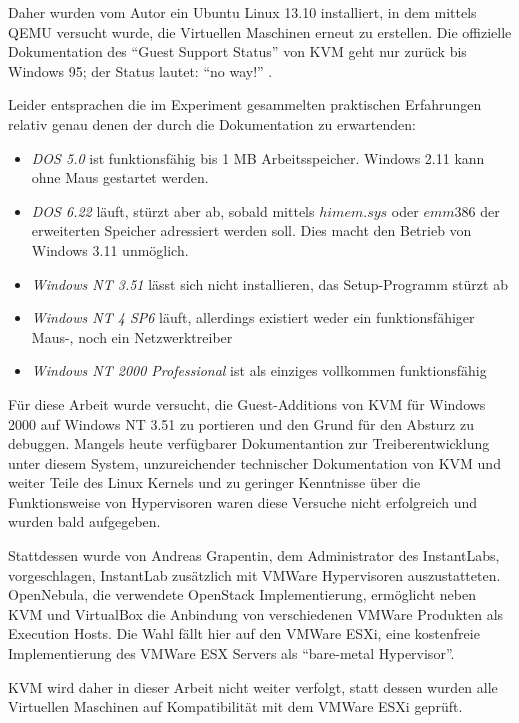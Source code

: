 	Daher wurden vom Autor ein Ubuntu Linux 13.10 installiert, in dem mittels QEMU versucht wurde, die Virtuellen Maschinen erneut zu erstellen.
	Die offizielle Dokumentation des "`Guest Support Status"' von KVM geht nur zurück bis Windows 95;
	der Status lautet: "`no way!"' \cite{KVMStatus}.

	Leider entsprachen die im Experiment gesammelten praktischen Erfahrungen relativ genau denen der durch die Dokumentation zu erwartenden:
	\begin{itemize}
		\item \emph{DOS 5.0} ist funktionsfähig bis 1 MB Arbeitsspeicher. Windows 2.11 kann ohne Maus gestartet werden.
		\item \emph{DOS 6.22} läuft, stürzt aber ab, sobald mittels $himem.sys$ oder $emm386$ der erweiterten Speicher adressiert werden soll. Dies macht den Betrieb von Windows 3.11 unmöglich.
		\item \emph{Windows NT 3.51} lässt sich nicht installieren, das Setup-Programm stürzt ab
		\item \emph{Windows NT 4 SP6} läuft, allerdings existiert weder ein funktionsfähiger Maus-, noch ein Netzwerktreiber
		\item \emph{Windows NT 2000 Professional} ist als einziges vollkommen funktionsfähig
	\end{itemize}


	Für diese Arbeit wurde versucht, die Guest-Additions von KVM für Windows 2000 auf Windows NT 3.51 zu portieren und den Grund für den Absturz zu debuggen.
	Mangels heute verfügbarer Dokumentantion zur Treiberentwicklung unter diesem System, unzureichender technischer Dokumentation von KVM und weiter Teile des Linux Kernels und zu geringer Kenntnisse über die Funktionsweise von Hypervisoren waren diese Versuche nicht erfolgreich und wurden bald aufgegeben. 

	Stattdessen wurde von Andreas Grapentin, dem Administrator des InstantLabs, vorgeschlagen, InstantLab zusätzlich mit VMWare Hypervisoren auszustatteten.
	OpenNebula, die verwendete OpenStack Implementierung, ermöglicht neben KVM und VirtualBox die Anbindung von verschiedenen VMWare Produkten als Execution Hosts.
	Die Wahl fällt hier auf den VMWare ESXi, eine kostenfreie Implementierung des VMWare ESX Servers als "`bare-metal Hypervisor"'. 

	KVM wird daher in dieser Arbeit nicht weiter verfolgt, statt dessen wurden alle Virtuellen Maschinen auf Kompatibilität mit dem VMWare ESXi geprüft.

